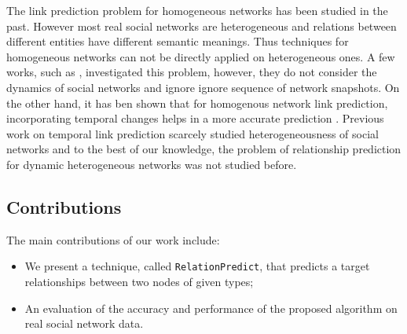 
The link prediction problem for homogeneous networks has been studied in the past.  However most real social networks are heterogeneous and relations between different entities have different semantic meanings. Thus techniques for homogeneous networks can not be directly applied on heterogeneous ones. A few works, such as \cite{sun2011pathsim,sun2011ASONAM}, investigated this problem, however, they do not consider the dynamics of social networks and ignore ignore sequence of network snapshots. On the other hand, it has ben shown that for homogenous network link prediction, incorporating temporal changes helps in a more accurate prediction \cite{Zhu2016}. Previous work on temporal link prediction scarcely studied heterogeneousness of social networks and to the best of our knowledge, the problem of relationship prediction for dynamic heterogeneous networks was not studied before.


\subsection{Contributions}

The main contributions of our work include:

\begin{itemize}

\item We present a technique, called \texttt{RelationPredict}, that predicts a target relationships between two nodes of given types;

\item An evaluation of the accuracy and performance of the proposed algorithm on real social network data.

\end{itemize}


